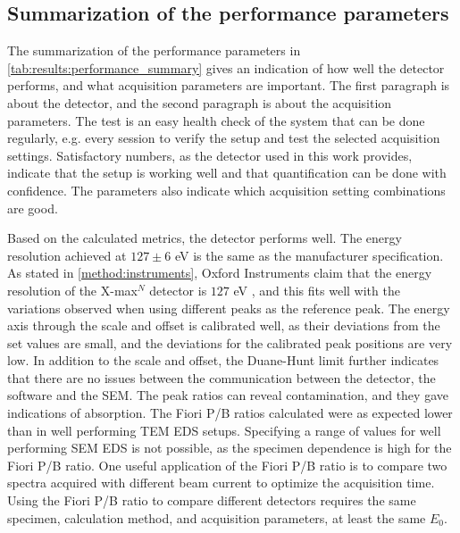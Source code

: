 \subsection{Summarization of the performance parameters}
\label{discussion:summarization_of_the_performance_parameters}

The summarization of the performance parameters in \cref{tab:results:performance_summary} gives an indication of how well the detector performs, and what acquisition parameters are important.
The first paragraph is about the detector, and the second paragraph is about the acquisition parameters.
The test is an easy health check of the system that can be done regularly, e.g. every session to verify the setup and test the selected acquisition settings.
Satisfactory numbers, as the detector used in this work provides, indicate that the setup is working well and that quantification can be done with confidence.
The parameters also indicate which acquisition setting combinations are good.


Based on the calculated metrics, the detector performs well.
The energy resolution achieved at $127 \pm6$ eV is the same as the manufacturer specification.
As stated in \cref{method:instruments}, Oxford Instruments claim that the energy resolution of the X-max$^N$ detector is $127$ eV \cite{xmaxn_datasheet}, and this fits well with the variations observed when using different peaks as the reference peak.
The energy axis through the scale and offset is calibrated well, as their deviations from the set values are small, and the deviations for the calibrated peak positions are very low.
In addition to the scale and offset, the Duane-Hunt limit further indicates that there are no issues between the communication between the detector, the software and the SEM.
The peak ratios can reveal contamination, and they gave indications of absorption.
The Fiori P/B ratios calculated were as expected lower than in well performing TEM EDS setups.
Specifying a range of values for well performing SEM EDS is not possible, as the specimen dependence is high for the Fiori P/B ratio.
One useful application of the Fiori P/B ratio is to compare two spectra acquired with different beam current to optimize the acquisition time.
Using the Fiori P/B ratio to compare different detectors requires the same specimen, calculation method, and acquisition parameters, at least the same $E_0$.


